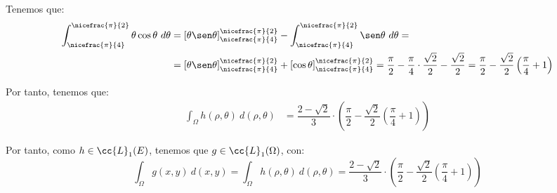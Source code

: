 \begin{ejercicio}
    Tenemos que:
    \begin{align*}
        \int_{\nicefrac{\pi}{4}}^{\nicefrac{\pi}{2}} \theta\cos\theta~d\theta &= \left[\theta\sen\theta\right]_{\nicefrac{\pi}{4}}^{\nicefrac{\pi}{2}} - \int_{\nicefrac{\pi}{4}}^{\nicefrac{\pi}{2}} \sen\theta~d\theta =\\
        &= \left[\theta\sen\theta\right]_{\nicefrac{\pi}{4}}^{\nicefrac{\pi}{2}} + \left[\cos\theta\right]_{\nicefrac{\pi}{4}}^{\nicefrac{\pi}{2}} = \dfrac{\pi}{2} - \dfrac{\pi}{4}\cdot \dfrac{\sqrt{2}}{2} -\dfrac{\sqrt{2}}{2}
        = \dfrac{\pi}{2} - \dfrac{\sqrt{2}}{2}\left(\dfrac{\pi}{4}+1\right)
    \end{align*}


    Por tanto, tenemos que:
    \begin{align*}
        \int_{\Omega} h(\rho, \theta)~d(\rho, \theta) &=
        \dfrac{2-\sqrt{2}}{3} \cdot \left(\dfrac{\pi}{2} - \dfrac{\sqrt{2}}{2}\left(\dfrac{\pi}{4}+1\right)\right)
    \end{align*}

    Por tanto, como $h\in \cc{L}_1(E)$, tenemos que $g\in \cc{L}_1(\Omega)$, con:
    \begin{equation*}
        \int_{\Omega} g(x, y)~d(x, y) = \int_{\Omega} h(\rho, \theta)~d(\rho, \theta) = \dfrac{2-\sqrt{2}}{3} \cdot \left(\dfrac{\pi}{2} - \dfrac{\sqrt{2}}{2}\left(\dfrac{\pi}{4}+1\right)\right)
    \end{equation*}
    

\end{ejercicio}